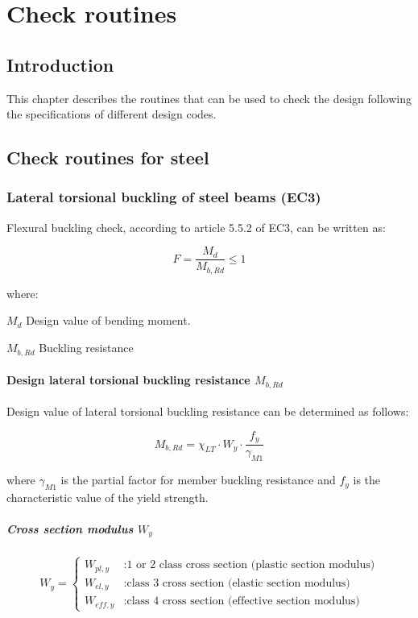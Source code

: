 \chapter{Check routines}
\section{Introduction}
This chapter describes the routines that can be used to check the design following the specifications of different design codes.

\section{Check routines for steel}

\subsection{Lateral torsional buckling of steel beams (EC3)}
Flexural buckling check, according to article 5.5.2 of EC3, can be written as:

\begin{equation}
F= \frac{M_d}{M_{b,Rd}} \leq 1
\end{equation}   

\noindent where:
\begin{description}
\item{$M_d$} Design value of bending moment.
\item{$M_{b,Rd}$} Buckling resistance
\end{description}

\subsubsection{Design lateral torsional buckling resistance $M_{b,Rd}$}
Design value of lateral torsional buckling resistance can be determined as follows:

\begin{equation}
M_{b,Rd}= \chi_{LT} \cdot W_y \cdot \frac{f_y}{\gamma_{M1}} 
\end{equation}

\noindent where $\gamma_{M1}$ is the partial factor for member buckling resistance and $f_y$ is the characteristic value of the yield strength.

\paragraph{Cross section modulus $W_y$}
\begin{equation}
W_y= \left\{
\begin{array}{lr}
W_{pl,y} & : \text{1 or 2 class cross section (plastic section modulus)}\\
W_{el,y} & : \text{class 3 cross section (elastic section modulus)}\\
W_{eff,y} & : \text{class 4 cross section (effective section modulus)}
\end{array}
\right.
\end{equation}

